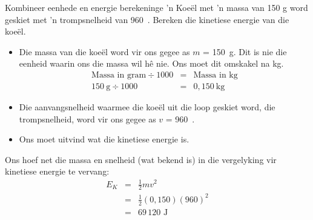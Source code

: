       \noindent
\begin{wex}{Kombineer eenhede en energie berekeninge }{ 'n Koe\"{e}l met  'n massa van 150 g word geskiet met  'n trompsnelheid van 960~\ms. Bereken die kinetiese energie van die koe\"{e}l.}
{
\begin{itemize}
\item Die massa van die koe\"{e}l word vir ons gegee as $m$ = 150~g. Dit is nie die eenheid waarin ons die massa wil h\^{e} nie. Ons moet dit omskakel na kg.
\begin{eqnarray*}
\text{Massa in gram} \div 1000 &=& \text{Massa in kg}\\
150~\text{g} \div 1000 &=& 0,150~\text{kg}
\end{eqnarray*}

\item Die aanvangsnelheid waarmee die koe\"{e}l uit die loop geskiet word, die trompsnelheid, word vir ons gegee as $v$ = 960~\ms.
\end{itemize}
\begin{itemize}
\item Ons moet uitvind wat die kinetiese energie is.
\end{itemize}

Ons hoef net die massa en snelheid (wat bekend is) in die vergelyking vir kinetiese energie te vervang:
\begin{eqnarray*}
E_{K} & = & \frac{1}{2}mv^2 \\
&= & \frac{1}{2}(0,150)(960)^2 \\
&=& 69\,120 \text{ J}
\end{eqnarray*}}
\end{wex}
    \noindent
\label{m38785*secfhsst!!!underscore!!!id1491}
